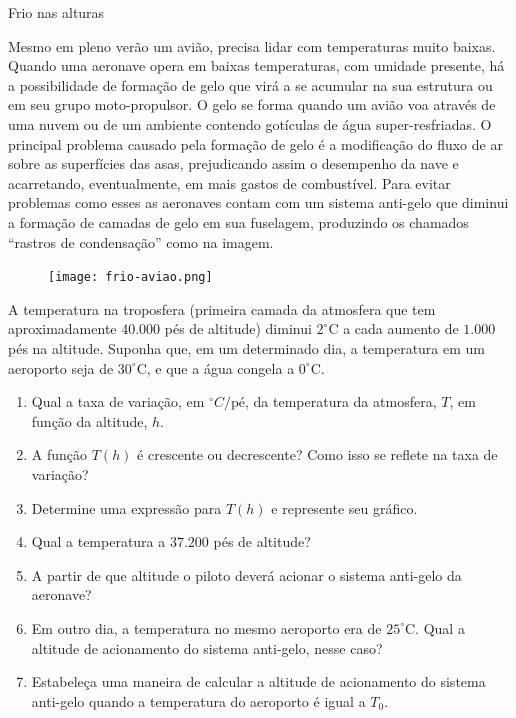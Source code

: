 \begin{task}{Frio nas alturas}
\label{\detokenize{AF107-6:atividade-frio-nas-alturas}}\label{\detokenize{AF107-6:id3}}

Mesmo em pleno verão um avião, precisa lidar com temperaturas muito baixas. Quando uma aeronave opera em baixas temperaturas, com umidade presente, há a possibilidade de formação de gelo que virá a se acumular na sua estrutura ou em seu grupo moto-propulsor. O gelo se forma quando um avião voa através de uma nuvem ou de um ambiente contendo gotículas de água super-resfriadas. O principal problema causado pela formação de gelo é a modificação do fluxo de ar sobre as superfícies das asas, prejudicando assim o desempenho da nave e acarretando, eventualmente, em mais gastos de combustível. Para evitar problemas como esses as aeronaves contam com um sistema anti-gelo que diminui a formação de camadas de gelo em sua fuselagem, produzindo os chamados “rastros de condensação” como na imagem.

\begin{figure}[H]
\centering

\noindent\texttt{[image: frio-aviao.png]}
\end{figure}

A temperatura na troposfera (primeira camada da atmosfera que tem aproximadamente \(40.000\) pés de altitude) diminui \(2^\circ\)C a cada aumento de \(1.000\) pés na altitude. Suponha que, em um determinado dia, a temperatura em um aeroporto seja de \(30^\circ\)C, e que a água congela a \(0^\circ\)C.
\begin{enumerate}
\item {} 
Qual a taxa de variação, em \(^\circ C/\text{pé}\), da temperatura da atmosfera, \(T\), em função da altitude, \(h\).

\item {} 
A função \(T(h)\) é crescente ou decrescente? Como isso se reflete na taxa de variação?

\item {} 
Determine uma expressão para \(T(h)\) e represente seu gráfico.

\item {} 
Qual a temperatura a \(37.200\) pés de altitude?

\item {} 
A partir de que altitude o piloto deverá acionar o sistema anti-gelo da aeronave?

\item {} 
Em outro dia, a temperatura no mesmo aeroporto era de \(25^\circ\)C. Qual a altitude de acionamento do sistema anti-gelo, nesse caso?

\item {} 
Estabeleça uma maneira de calcular a altitude de acionamento do sistema anti-gelo quando a temperatura do aeroporto é igual a \(T_0\).

\end{enumerate}
\end{task}

